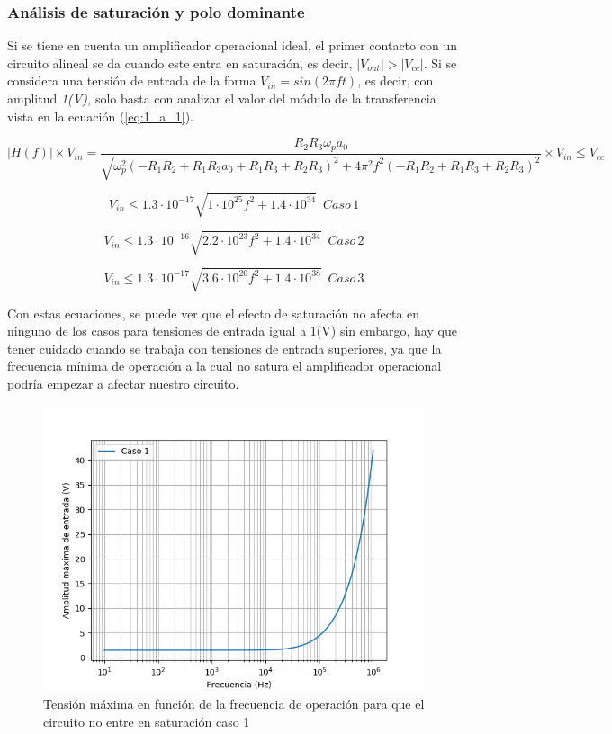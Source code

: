 \subsubsection{Análisis de saturación y polo dominante}

Si se tiene en cuenta un amplificador operacional ideal, el primer
contacto con un circuito alineal se da cuando este entra en saturación,
es decir, $\left|V_{out}\right|>\left|V_{cc}\right|$. Si se considera
una tensión de entrada de la forma $V_{in}=sin(2\pi ft)$, es decir,
con amplitud \emph{1(V), }solo basta con analizar el valor del módulo
de la transferencia vista en la ecuación (\ref{eq:1_a_1}).

\[
\left|H(f)\right|\times V_{in}=\frac{R_{2}R_{3}\omega_{p}a_{0}}{\sqrt{\omega_{p}^{2}\left(-R_{1}R_{2}+R_{1}R_{3}a_{0}+R_{1}R_{3}+R_{2}R_{3}\right)^{2}+4\pi^{2}f^{2}\left(-R_{1}R_{2}+R_{1}R_{3}+R_{2}R_{3}\right)^{2}}}\times V_{in}\leq V_{cc}
\]

\[
V_{in}\leq1.3\cdot10^{-17}\sqrt{1\cdot10^{25}f^{2}+1.4\cdot10^{34}}\,\,\,Caso\,1
\]

\[
V_{in}\leq1.3\cdot10^{-16}\sqrt{2.2\cdot10^{23}f^{2}+1.4\cdot10^{34}}\,\,\,Caso\,2
\]

\[
V_{in}\leq1.3\cdot10^{-17}\sqrt{3.6\cdot10^{26}f^{2}+1.4\cdot10^{38}}\,\,\,Caso\,3
\]

Con estas ecuaciones, se puede ver que el efecto de saturación no
afecta en ninguno de los casos para tensiones de entrada igual a 1(V)
sin embargo, hay que tener cuidado cuando se trabaja con tensiones
de entrada superiores, ya que la frecuencia mínima de operación a
la cual no satura el amplificador operacional podría empezar a afectar
nuestro circuito.

\begin{figure}[H]
\begin{centering}
\includegraphics[scale=0.5]{../Ex1/iA/Resources1a/sat1}
\par\end{centering}
\centering{}\caption{Tensión máxima en función de la frecuencia de operación para que el
circuito no entre en saturación caso 1}
\end{figure}

